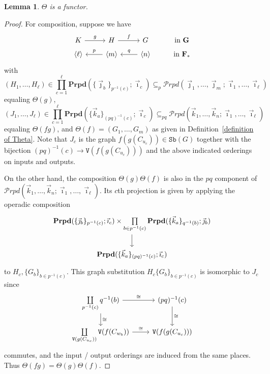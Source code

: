 \documentclass{amsart}
\numberwithin{theorem}{subsection}
\newtheorem{lemma}[theorem]{Lemma}
\theoremstyle{definition}
\newcommand{\finsetskel}{\mathbf{F}}
\newcommand{\pfinsetskel}{\finsetskel_*}
\newcommand{\bbY}{\mathbf{G}}
\newcommand{\sub}{\mathtt{Sb}}
\newcommand{\vertex}{\mathtt{V}}
\newcommand{\calproperad}{\mathcal{P}rpd}
\newcommand{\bfproperad}{\mathbf{Prpd}}
\newcommand{\nsqelt}[1]{\vec{#1}}
\begin{document}
\begin{lemma}
$\Theta$ is a functor.
\end{lemma}
\begin{proof}
For composition, suppose we have
\[ \begin{tikzcd}[row sep=tiny]
K \rar{g} & H \rar{f} & G & \text{in $\bbY$} \\
\langle \ell \rangle & \langle m \rangle \lar["p" swap] & \langle n \rangle \lar["q" swap] & \text{in $\pfinsetskel$}
\end{tikzcd} \]
with 
\[
	(H_1, \dots, H_\ell) \in \prod_{c=1}^\ell \bfproperad(\{ \nsqelt{\jmath}_b \}_{p^{-1}(c)}; \nsqelt{\imath}_c) \subseteq_{p} \calproperad (\nsqelt{\jmath}_1, \dots, \nsqelt{\jmath}_m; \nsqelt{\imath}_1, \dots, \nsqelt{\imath}_\ell)
\]
equaling $\Theta(g)$, 
\[
	(J_1, \dots, J_\ell) \in \prod_{c=1}^\ell \bfproperad(\{\nsqelt{k}_a\}_{(pq)^{-1}(c)}; \nsqelt{\imath}_c) \subseteq_{pq} \calproperad (\nsqelt{k}_1, \dots, \nsqelt{k}_n; \nsqelt{\imath}_1, \dots, \nsqelt{\imath}_\ell)
\]
equaling $\Theta(fg)$, and $\Theta(f) = (G_1, \dots, G_m)$ as given in Definition~\ref{definition of Theta}.
Note that $J_c$ is the graph $f(g(C_{u_c})) \in \sub(G)$ together with the bijection $(pq)^{-1}(c) \to \vertex(f(g(C_{u_c})))$ and the above indicated orderings on inputs and outputs. 

On the other hand, the composition $\Theta(g)\Theta(f)$ is also in the $pq$ component of $\calproperad (\nsqelt{k}_1, \dots, \nsqelt{k}_n; \nsqelt{\imath}_1, \dots, \nsqelt{\imath}_\ell)$.
Its $c$th projection is given by applying the operadic composition
\[\begin{tikzcd}
\bfproperad(\{ \nsqelt{\jmath}_b \}_{p^{-1}(c)}; \nsqelt{\imath}_c) \times \prod\limits_{b\in p^{-1}(c)} \bfproperad(\{\nsqelt{k}_a\}_{q^{-1}(b)}; \nsqelt{\jmath}_b) \dar \\ 
\bfproperad(\{\nsqelt{k}_a\}_{(pq)^{-1}(c)}; \nsqelt{\imath}_c)
\end{tikzcd}
\]
to $H_c, \{ G_b \}_{b\in p^{-1}(c)}$.
This graph substitution $H_c \{ G_b \}_{b\in p^{-1}(c)}$ is isomorphic to $J_c$ since
\[ \begin{tikzcd}
\coprod\limits_{p^{-1}(c)} q^{-1}(b) \rar{\cong} \dar{\cong} & (pq)^{-1}(c) \dar{\cong} \\
\coprod\limits_{\vertex(g(C_{u_c}))} \vertex(f(C_{w_b})) \rar{\cong} &  \vertex(f(g(C_{u_c})))
\end{tikzcd} \]
commutes, and the input / output orderings are induced from the same places.
Thus $\Theta(fg) = \Theta(g)\Theta(f)$.
\end{proof}
\end{document}
